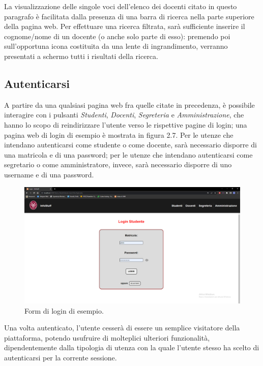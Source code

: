 \documentclass [a4paper,11pt]{book}
\begin{document}
La visualizzazione delle singole voci dell'elenco dei docenti citato in questo paragrafo è facilitata dalla presenza di una barra di ricerca nella parte superiore della pagina web. Per effettuare una ricerca filtrata, sarà sufficiente inserire il cognome/nome di un docente (o anche solo parte di esso): premendo poi sull'opportuna icona costituita da una lente di ingrandimento, verranno presentati a schermo tutti i risultati della ricerca.

\medskip

\subsection{Autenticarsi}

A partire da una qualsiasi pagina web fra quelle citate in precedenza, è possibile interagire con i pulsanti \emph{Studenti}, \emph{Docenti}, \emph{Segreteria} e \emph{Amministrazione}, che hanno lo scopo di reindirizzare l'utente verso le rispettive pagine di login; una pagina web di login di esempio è mostrata in figura 2.7. Per le utenze che intendano autenticarsi come studente o come docente, sarà necessario disporre di una matricola e di una password; per le utenze che intendano autenticarsi come segretario o come amministratore, invece, sarà necessario disporre di uno username e di una password.

\begin{figure}
\centering
\includegraphics[scale=0.3]{figura2-7.png}
\caption{Form di login di esempio.}
\end{figure}

Una volta autenticato, l'utente cesserà di essere un semplice visitatore della piattaforma, potendo usufruire di molteplici ulteriori funzionalità, dipendentemente dalla tipologia di utenza con la quale l'utente stesso ha scelto di autenticarsi per la corrente sessione.
\end{document}

